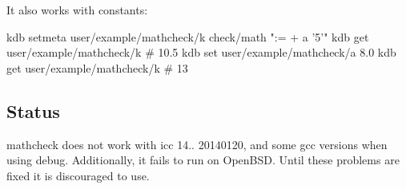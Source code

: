 It also works with constants\+: \begin{DoxyVerb}    kdb setmeta user/example/mathcheck/k check/math ":= + a '5'"
    kdb get user/example/mathcheck/k       # 10.5
    kdb set user/example/mathcheck/a 8.0
    kdb get user/example/mathcheck/k       # 13
\end{DoxyVerb}


\subsection*{Status}

mathcheck does not work with icc 14.. 20140120, and some gcc versions when using debug. Additionally, it fails to run on Open\+B\+S\+D. Until these problems are fixed it is discouraged to use. 